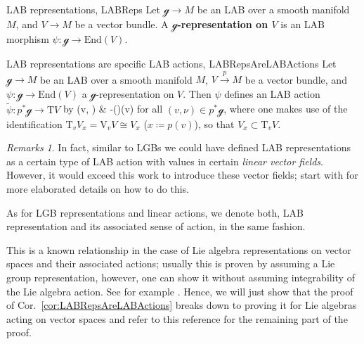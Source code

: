 \documentclass[a4paper,oneside,11pt,bibliography=totoc]{scrartcl}
\def\bas#1\eas{\begin{align*}#1\end{align*}}
\theoremstyle{plain}
\theoremstyle{remark}
\newtheorem{remark}[theorem]{Remarks}
\theoremstyle{definition}
\begin{document}
\begin{definitions}{LAB representations, \cite[\S 3.3, Def.\ 3.3.13, page 107]{mackenzieGeneralTheory}}{LABReps}
Let $\mathcal{g} \to M$ be an LAB over a smooth manifold $M$, and $V \to M$ be a vector bundle. A \textbf{$\mathcal{g}$-representation on $V$} is an LAB morphism $\psi: \mathcal{g} \to \mathrm{End}(V)$.
\end{definitions}

\begin{corollaries}{LAB representations are specific LAB actions, \newline \cite[\S 4.1, special consequence of Prop.\ 4.1.7 but we do not assume integrability of the LAB, page 153]{mackenzieGeneralTheory}}{LABRepsAreLABActions}
Let $\mathcal{g} \to M$ be an LAB over a smooth manifold $M$, $V \stackrel{p}{\to} M$ be a vector bundle, and $\psi: \mathcal{g} \to \mathrm{End}(V)$ a $\mathcal{g}$-representation on $V$. Then $\psi$ defines an LAB action $\widetilde{\psi}: p^*\mathcal{g} \to \mathrm{T}V$ by
\bas
\widetilde{\psi}(v, \nu)
&\coloneqq
-\psi(\nu)(v)
\eas
for all $(v, \nu) \in p^*\mathcal{g}$, where one makes use of the identification $\mathrm{T}_vV_x = \mathrm{V}_vV \cong V_x$ ($x \coloneqq p(v)$), so that $V_x \subset \mathrm{T}_vV$.
\end{corollaries}

\begin{remark}
\leavevmode\newline
In fact, similar to LGBs we could have defined LAB representations as a certain type of LAB action with values in certain \textit{linear vector fields}. However, it would exceed this work to introduce these vector fields; start with \cite[\S 3.4, page 110]{mackenzieGeneralTheory} for more elaborated details on how to do this.

As for LGB representations and linear actions, we denote both, LAB representation and its associated sense of action, in the same fashion.
\end{remark}

This is a known relationship in the case of Lie algebra representations on vector spaces and their associated actions; usually this is proven by assuming a Lie group representation, however, one can show it without assuming integrability of the Lie algebra action. See for example \cite[\S 2.1, proof of Prop.\ 2.1.16, page 22]{MyThesis}. Hence, we will just show that the proof of Cor.\ \ref{cor:LABRepsAreLABActions} breaks down to proving it for Lie algebras acting on vector spaces and refer to this reference for the remaining part of the proof.
\end{document}
